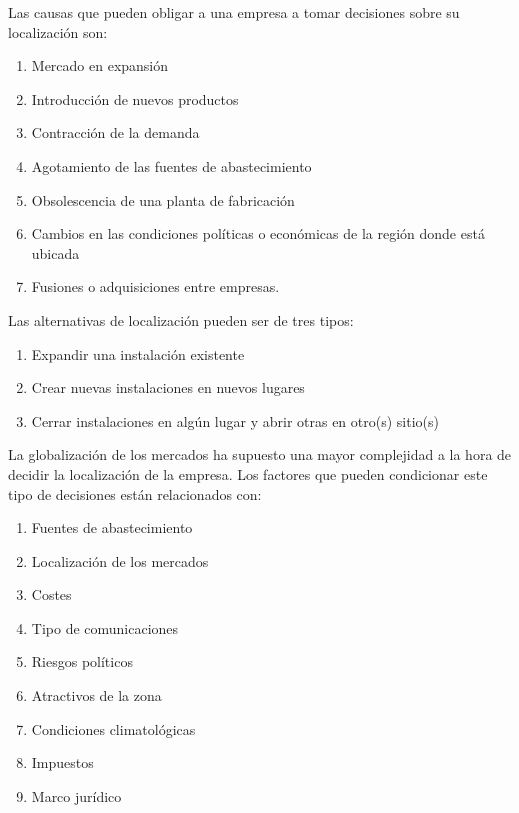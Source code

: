 \documentclass[10pt,a4paper,spanish]{report}
\begin{document}
                  Las causas que pueden obligar a una empresa a tomar decisiones sobre su localización son:
                  \begin{enumerate} [1.]
                        \item Mercado en expansión
                        \item Introducción de nuevos productos
                        \item Contracción de la demanda
                        \item Agotamiento de las fuentes de abastecimiento
                        \item Obsolescencia de una planta de fabricación
                        \item Cambios en las condiciones políticas o económicas de la región donde está ubicada
                        \item Fusiones o adquisiciones entre empresas.
                  \end{enumerate}

                  Las alternativas de localización pueden ser de tres tipos:
                  \begin{enumerate}[1º]
                        \item Expandir una instalación existente
                        \item Crear nuevas instalaciones en nuevos lugares
                        \item Cerrar instalaciones en algún lugar y abrir otras en otro(s) sitio(s)
                  \end{enumerate}

                  La globalización de los mercados ha supuesto una mayor complejidad a la hora de decidir la localización de la empresa. Los factores que pueden condicionar este tipo de decisiones están relacionados con:
                  \begin{enumerate}
                        \item Fuentes de abastecimiento
                        \item Localización de los mercados
                        \item Costes
                        \item Tipo de comunicaciones
                        \item Riesgos políticos
                        \item Atractivos de la zona
                        \item Condiciones climatológicas
                        \item Impuestos
                        \item Marco jurídico
                  \end{enumerate}
\end{document}
